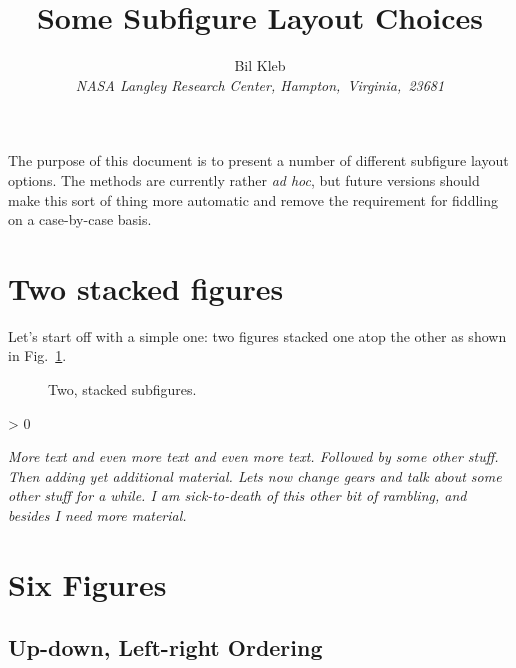 \documentclass{aiaa}%
\title{Some Subfigure Layout Choices}
\author{Bil Kleb\\
       {\it NASA Langley Research Center, Hampton,~Virginia,~23681}}
\makeatletter
\newcounter{numrepeat}
\newcommand{\replicate}[2]{\par
 \setcounter{numrepeat}{#1}\relax
 \@whilenum \value{numrepeat} > 0 \do
  {{#2}\addtocounter{numrepeat}{-1}}\par}
\newcommand{\filler}%
  {\em More text and even more text and even more text.
   Followed by some other stuff.
   Then adding yet additional material.
   Lets now change gears and talk about some other stuff for a while.
   I am sick-to-death of this other bit of rambling,
   and besides I need more material.}
\makeatother
\begin{document}
\maketitle

The purpose of this document is to present a number
of different subfigure layout options.  The methods are currently
rather {\em ad hoc}, but future versions should make this sort
of thing more automatic and remove the requirement for
fiddling on a case-by-case basis.


\section{Two stacked figures}

Let's start off with a simple one: two figures stacked one atop the
other as shown in Fig.~\ref{fig:3f}.
\begin{figure}
  \begin{subfigmatrix}{1}
  \end{subfigmatrix}
  \caption{Two, stacked subfigures.}
  \label{fig:3f}
\end{figure}
\replicate{3}{\filler}


\section{Six Figures}

\subsection{Up-down, Left-right Ordering}
\end{document}
